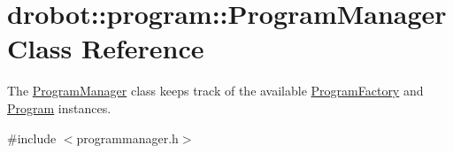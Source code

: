 \hypertarget{classdrobot_1_1program_1_1ProgramManager}{\section{drobot\-:\-:program\-:\-:Program\-Manager Class Reference}
\label{classdrobot_1_1program_1_1ProgramManager}
}


The \hyperlink{classdrobot_1_1program_1_1ProgramManager}{Program\-Manager} class keeps track of the available \hyperlink{classdrobot_1_1program_1_1ProgramFactory}{Program\-Factory} and \hyperlink{classdrobot_1_1program_1_1Program}{Program} instances.  




{\ttfamily \#include $<$programmanager.\-h$>$}

